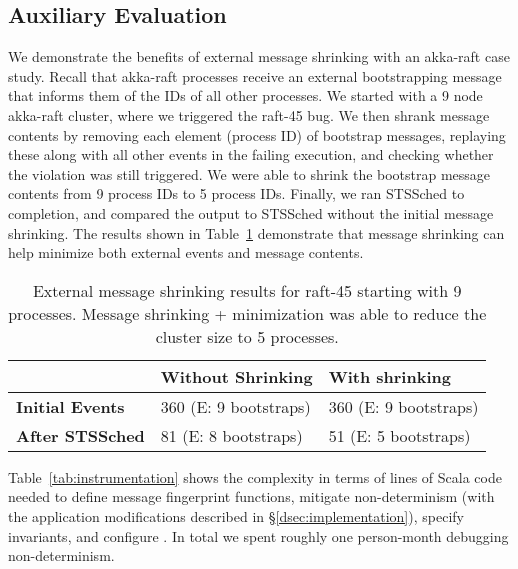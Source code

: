 \subsection{Auxiliary Evaluation}

 We demonstrate the benefits of
external message shrinking with an akka-raft case study. Recall that akka-raft
processes receive an external bootstrapping message that informs
them of the IDs of all other processes. We started with a 9 node akka-raft
cluster, where we triggered the raft-45 bug.
We then shrank message contents by removing each element (process ID) of bootstrap messages,
replaying these along with all other events in the failing execution, and
checking whether the violation was still triggered. We were able to shrink the
bootstrap message contents from 9 process IDs to 5 process IDs. Finally, we
ran STSSched to completion, and compared the output to STSSched without the
initial message shrinking. The results shown in
Table~\ref{tab:message_shrinking} demonstrate that message shrinking can help
minimize both external events and message contents.

\begin{table}
\centering
\footnotesize
\begin{tabular}{|l|l|l|}
  \cline{2-3}
  \multicolumn{1}{c|}{~} & \textbf{Without Shrinking} & \textbf{With
  shrinking} \\\cline{2-3} \hline
{\bf Initial Events} & 360 \hfill (E: 9 bootstraps) & 360 \hfill (E: 9 bootstraps) \\
\hline
{\bf After STSSched} & 81 \hfill (E: 8 bootstraps) & 51 \hfill (E: 5 bootstraps) \\
\hline
\end{tabular}
\caption{External message shrinking results for raft-45 starting with 9
processes. Message shrinking + minimization was able to reduce the cluster
size to 5 processes.}
\label{tab:message_shrinking}
\end{table}

 Table~\ref{tab:instrumentation} shows
the complexity in terms of lines of Scala code needed to define message fingerprint
functions, mitigate non-determinism (with the application modifications
described in \S\ref{dsec:implementation}), specify invariants, and configure
\sys. In total we spent roughly one person-month debugging
non-determinism.

